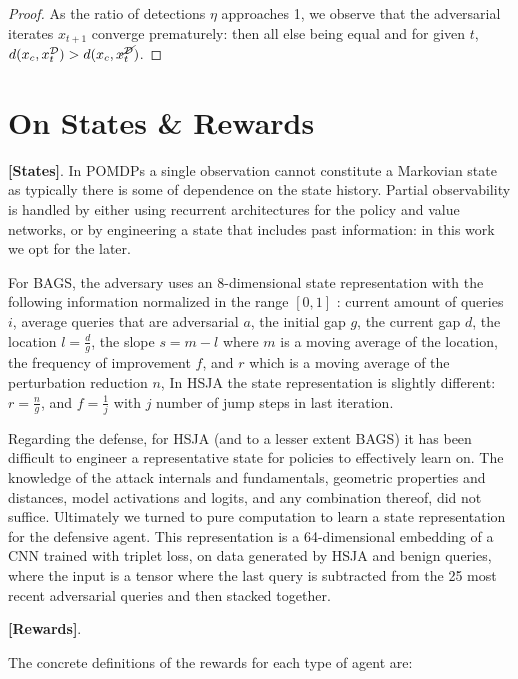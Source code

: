 \begin{proof}
As the ratio of detections $\eta$ approaches 1, we observe that the adversarial iterates $x_{t+1}$ converge prematurely: then all else being equal and for given $t$, $d(x_c,x^\mathcal{D}_t) > d(x_c, x^{\cancel{\mathcal{D}}}_t)$.

\end{proof}

\section{On States \& Rewards}
\label{apx:rew}
\textbf{[States]}. In POMDPs a single observation cannot constitute a Markovian state as typically there is some of dependence on the state history.
Partial observability is handled by either using recurrent architectures for the policy and value networks, or by engineering a state that includes past information: in this work we opt for the later.

For BAGS, the adversary uses an 8-dimensional state representation with the following information normalized in the range $[0,1]$ : current amount of queries $i$, average queries that are adversarial $a$, the initial gap $g$, the current gap $d$, the location $l = \frac{d}{g}$, the slope $s = m - l$ where $m$ is a moving average of the location, the frequency of improvement $f$, and $r$ which is a moving average of the perturbation reduction $n$, 
In HSJA the state representation is slightly different: $r = \frac{n}{g}$, and $f = \frac{1}{j}$ with $j$ number of jump steps in last iteration.

Regarding the defense, for HSJA (and to a lesser extent BAGS) it has been difficult to engineer a representative state for policies to effectively learn on.
The knowledge of the attack internals and fundamentals, geometric properties and distances, model activations and logits, and any combination thereof, did not suffice.
Ultimately we turned to pure computation to learn a state representation for the defensive agent.
This representation is a 64-dimensional embedding of a CNN trained with triplet loss, on data generated by HSJA and benign queries, where the input is a tensor where the last query is subtracted from the 25 most recent adversarial queries and then stacked together.

\textbf{[Rewards]}.

The concrete definitions of the rewards for each type of agent are:

